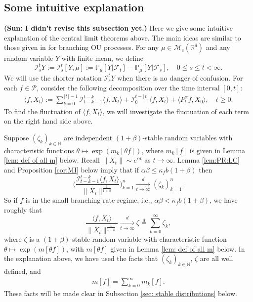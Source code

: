 \documentclass[12pt,a4paper]{amsart}
\theoremstyle{plain}
\theoremstyle{definition}
\numberwithin{equation}{section}
\begin{document}
\subsection{Some intuitive explanation}
{\bf (Sun: I didn't revise this subsection yet.)}
Here we give some intuitive explanation of the central limit theorems above.
The main ideas are similar to those given in \cite{MarksMilos2018CLT} for branching OU processes.
For any $\mu\in \mathcal M_c(\mathbb R^d)$ and any random variable $Y$ with finite mean, we define
\begin{equation}
  \label{Ist}
  \mathcal I_s^t Y
  := \mathcal I_s^t [Y, \mu]
  := \mathbb P_\mu[Y|\mathscr F_t] - \mathbb P_\mu[Y|\mathscr F_s],
  \quad 0 \leq s \leq t <\infty.
\end{equation}
We will use the shorter notation $\mathcal I_s^t Y$ when there is no danger of confusion.
For each $f\in \mathcal{P}$, consider the following decomposition over the time interval $[0,t]$:
\begin{align}
  \langle f,X_t\rangle
  := \sum_{k=0}^{\lfloor t \rfloor-1} \mathcal I_{t-k-1}^{t-k}\langle f ,X_t\rangle+\mathcal I_0^{t-\lfloor t \rfloor}\langle f ,X_t\rangle + \langle P^\alpha_tf,X_0\rangle,
  \quad t\geq 0.
\end{align}
To find the fluctuation of $\langle f,X_t\rangle$, we will investigate the fluctuation of each term on the right hand side above.

Suppose $(\zeta_k)_{k \in \mathbb N}$ are independent $(1+\beta)$-stable random variables with characteristic functions $\theta\mapsto \exp( m_k[\theta f])$, where $m_k[f]$ is given in Lemma \ref{lem: def of all m} below.
Recall $\|X_t\|\sim e^{\alpha t}$ as $t\to\infty$.
Lemma \ref{lem:PR:LC} and Proposition \ref{cor:MI} below imply that if $\alpha\beta \leq \kappa_f b(1+\beta) $ then
\[
  \bigg(\frac{\mathcal I^{t-k}_{t-k-1} \langle f,X_t\rangle}{\|X_t\|^{\frac{1}{1+\beta}}} \bigg)_{k=1}^n
  \xrightarrow [t\to \infty]{d} (\zeta_k)_{k=1}^n.
\]
So if $f$ is in the small branching rate regime, i.e., $\alpha \beta < \kappa_f b(1+\beta)$, we have roughly that
\[
  \frac{\langle f,X_t\rangle}{\|X_t\|^{\frac{1}{1+\beta}}} 
  \xrightarrow[t\to \infty]{d} \zeta\overset{d}{=}\sum_{k=0}^\infty \zeta_k,
\]
where $\zeta$ is a $(1+\beta)$-stable random variable with characteristic function $\theta\mapsto \exp(m[\theta f])$, with $m[\theta f]$ given in Lemma \ref{lem: def of all m} below.
In the explanation above, we have used the facts that $(\zeta_k)_{k\in \mathbb N}$, $\zeta$ are all well defined, and
\begin{align}
  \label{eq: equatlity for mf for small rate}
  m[f] 
  = \sum_{k=0}^\infty m_k[ f].
\end{align}
These facts will be made clear in Subsection \ref{sec: stable distributions} below.
\end{document}
